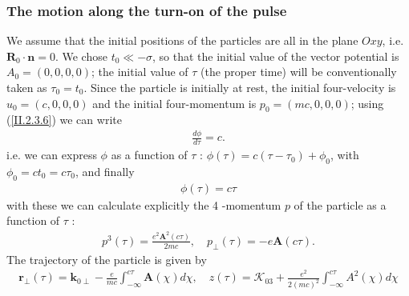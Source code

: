 \subsubsection{The motion along the turn-on of the pulse}
We assume that the initial positions of the particles are all in the plane $O x y$, i.e. $\mathbf{R}_{0} \cdot \mathbf{n}=0$. We chose $t_{0} \ll-\sigma$, so that the initial value of the vector potential is $A_{0}=(0,0,0,0)$; the initial value of $\tau$ (the proper time) will be conventionally taken as $\tau_{0}=t_{0}$. Since the particle is initially at rest, the initial four-velocity is $u_{0}=(c, 0,0,0)$ and the initial four-momentum is $p_{0}=(m c, 0,0,0)$; using (\ref{II.2.3.6}) we can write
\begin{align}
  \frac{d \phi}{d \tau}=c . \label{II.2.4.1}
\end{align}
i.e. we can express $\phi$ as a function of $\tau$ : $\phi(\tau)=c\left(\tau-\tau_{0}\right)+\phi_{0}$, with $\phi_{0}=c t_{0}=c \tau_{0}$, and finally
\begin{align}
  \phi(\tau)=c \tau \label{II.2.4.2}
\end{align}
with these we can calculate explicitly the 4 -momentum $p$ of the particle as a function of $\tau$ :
\begin{align}
  p^{3}(\tau)=\frac{e^{2} \mathbf{A}^{2}(c \tau)}{2 m c}, \quad p_{\perp}(\tau)=-e \mathbf{A}(c \tau) . \label{II.2.4.3}
\end{align}
The trajectory of the particle is given by
\begin{align}
  \mathbf{r}_{\perp}(\tau)=\mathbf{k}_{0 \perp}-\frac{e}{m c} \int_{-\infty}^{c \tau} \mathbf{A}(\chi) d \chi, \quad z(\tau)=\mathcal{K}_{03}+\frac{e^{2}}{2(m c)^{2}} \int_{-\infty}^{c \tau} A^{2}(\chi) d \chi \label{II.2.4.4}
\end{align}
